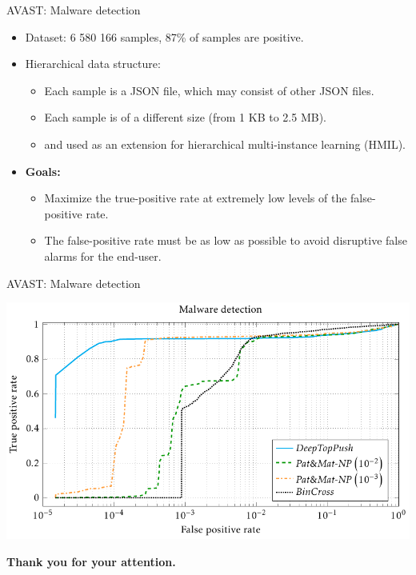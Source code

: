 \documentclass[10pt, aspectratio=169]{beamer}
\begin{document}
\begin{frame}{AVAST: Malware detection}
  \begin{itemize}
    \item Dataset: 6 580 166 samples, 87\% of samples are positive.
    \item Hierarchical data structure:
    \begin{itemize}
      \item Each sample is a JSON file, which may consist of other JSON files.
      \item Each sample is of a different size (from 1 KB to 2.5 MB).
      \item \DeepTopPush and \PatMatNP used as an extension for hierarchical multi-instance learning (HMIL).
    \end{itemize}
    \item \textbf{Goals:}
    \begin{itemize}
      \item Maximize the true-positive rate at extremely low levels of the false-positive rate.
      \item The false-positive rate must be as low as possible to avoid disruptive false alarms for the end-user.
    \end{itemize}
  \end{itemize}
\end{frame}

\begin{frame}{AVAST: Malware detection}
  \begin{center}
    \includegraphics[width=\linewidth, height=0.9\textheight, keepaspectratio]{
      ../images/malware_detection.pdf
    }
  \end{center}
\end{frame}

\begin{frame}
  \vfill \par
  \begin{center}
    \textbf{\Large{Thank you for your attention.}}
  \end{center}\par
  \vfill
\end{frame}
\end{document}
